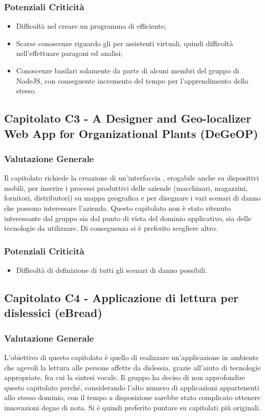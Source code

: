      \subsubsection{Potenziali Criticità}
      \begin{itemize}
       \item Difficoltà nel creare un programma di  efficiente;
       \item Scarse conoscenze riguardo gli  per assistenti virtuali, quindi difficoltà nell'effettuare paragoni ed analisi;
       \item Conoscenze basilari solamente da parte di alcuni membri del gruppo di NodeJS, con conseguente incremento del tempo per l'apprendimento dello stesso.
      \end{itemize}
  \subsection{Capitolato C3 - A Designer and Geo-localizer Web App for Organizational Plants (DeGeOP)}
    \subsubsection{Valutazione Generale}
    Il capitolato richiede la creazione di un'interfaccia , erogabile anche su dispositivi mobili, per inserire i processi produttivi delle aziende (macchinari, magazzini, fornitori, distributori) su mappa geografica e per disegnare i vari scenari di danno che possono interessare l'azienda. 
    Questo capitolato non è stato ritenuto interessante dal gruppo sia dal punto di vista del dominio applicativo, sia delle tecnologie da utilizzare. Di conseguenza si è preferito scegliere altro.
    \subsubsection{Potenziali Criticità}
    \begin{itemize}
     \item Difficoltà di definizione di tutti gli scenari di danno possibili.
    \end{itemize}
\subsection{Capitolato C4 - Applicazione di lettura per dislessici (eBread)}
    \subsubsection{Valutazione Generale}
    L'obiettivo di questo capitolato è quello di realizzare un'applicazione in ambiente  che agevoli la lettura alle persone affette da dislessia, grazie all'aiuto di tecnologie appropriate, fra cui la sintesi vocale.
Il gruppo ha deciso di non approfondire questo capitolato perché, considerando l'alto numero di applicazioni appartenenti allo stesso dominio, con il tempo a disposizione sarebbe stato complicato ottenere innovazioni degne di nota. Si è quindi preferito puntare su capitolati più originali.
